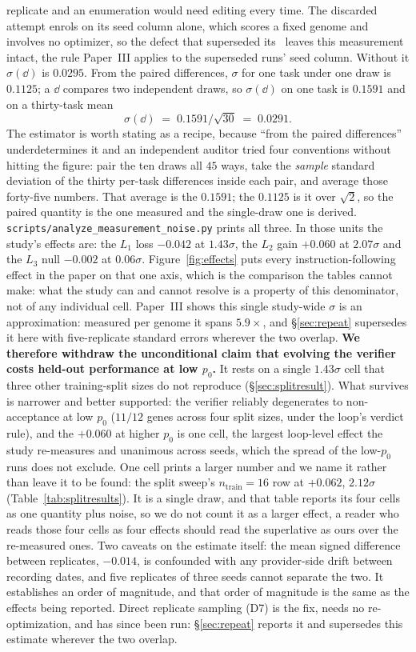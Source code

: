\documentclass[11pt]{article}
\begin{document}
replicate and an enumeration would need editing every time. The discarded attempt enrols on its
seed column alone, which scores a fixed genome and involves no optimizer, so the defect that
superseded its \dd\ leaves this measurement intact, the rule Paper~III applies to the superseded
runs' seed column. Without it $\sigma(\dd)$ is $0.0295$.
From the paired differences, $\sigma$ for one task under one draw is $0.1125$; a $\dd$ compares
two independent draws, so $\sigma(\dd)$ on one task is $0.1591$ and on a thirty-task mean
\[
\sigma(\dd) \;=\; 0.1591/\sqrt{30} \;=\; 0.0291 .
\]
The estimator is worth stating as a recipe, because ``from the paired differences'' underdetermines
it and an independent auditor tried four conventions without hitting the figure: pair the ten draws
all $45$ ways, take the \emph{sample} standard deviation of the thirty per-task differences inside
each pair, and average those forty-five numbers. That average is the $0.1591$; the $0.1125$ is it
over $\sqrt{2}$, so the paired quantity is the one measured and the single-draw one is derived.
\texttt{scripts/analyze\_measurement\_noise.py} prints all three.
In those units the study's effects are: the $L_1$ loss $-0.042$ at $1.43\sigma$, the $L_2$ gain
$+0.060$ at $2.07\sigma$ and the $L_3$ null $-0.002$ at $0.06\sigma$.
Figure~\ref{fig:effects} puts every instruction-following effect in the paper on that one axis,
which is the comparison the tables cannot make: what the study can and cannot resolve is a
property of this denominator, not of any individual cell. Paper~III shows this
single study-wide $\sigma$ is an approximation: measured per genome it spans $5.9\times$,
and \S\ref{sec:repeat} supersedes it here with five-replicate standard errors wherever the two
overlap. \textbf{We therefore withdraw the unconditional claim that evolving
the verifier costs held-out performance at low $p_0$.} It rests on a single $1.43\sigma$ cell
that three other training-split sizes do not reproduce (\S\ref{sec:splitresult}). What survives
is narrower and better supported: the verifier reliably degenerates to non-acceptance at low
$p_0$ ($11/12$ genes across four split sizes, under the loop's verdict rule), and the $+0.060$
at higher $p_0$ is one cell, the largest loop-level effect the study re-measures and unanimous
across seeds, which the spread of the low-$p_0$ runs does not exclude. One cell prints a
larger number and we name it rather than leave it to be found: the split sweep's
$n_{\mathrm{train}}{=}16$ row at $+0.062$, $2.12\sigma$ (Table~\ref{tab:splitresults}). It is a
single draw, and that table reports its four cells as one quantity plus noise, so we do not count
it as a larger effect, a reader who reads those four cells as four effects should read the
superlative as ours over the re-measured ones. Two caveats on the estimate
itself: the mean signed difference
between replicates, $-0.014$, is confounded with any provider-side drift between recording
dates, and five replicates of three seeds cannot separate the two. It establishes an order of
magnitude, and that order of magnitude is the same as the effects being reported. Direct
replicate sampling (D7) is the fix, needs no re-optimization, and has since been run:
\S\ref{sec:repeat} reports it and supersedes this estimate wherever the two overlap.
\end{document}
